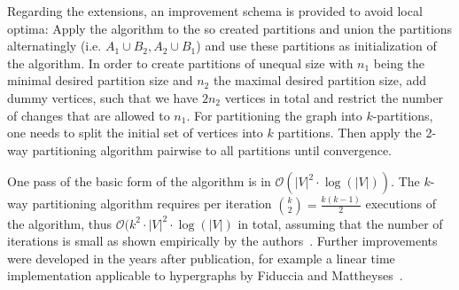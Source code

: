                 Regarding the extensions, an improvement schema is provided to avoid local optima:
                Apply the algorithm to the so created partitions and union the partitions alternatingly (i.e. $A_1 \cup B_2, A_2 \cup B_1$) and use these partitions as initialization of the algorithm.
                In order to create partitions of unequal size with $n_1$ being the minimal desired partition size and $n_2$ the maximal desired partition size, add dummy vertices, such that we have $2n_2$ vertices in total and restrict the number of changes that are allowed to $n_1$.
                For partitioning the graph into $k$-partitions, one needs to split the initial set of vertices into $k$ partitions. 
                Then apply the 2-way partitioning algorithm pairwise to all partitions until convergence.
                
                One pass of the basic form of the algorithm is in $\mathcal{O}(|V|^2 \cdot \log(|V|))$. The $k$-way partitioning algorithm requires per iteration $\binom{k}{2} = \frac{k (k - 1)}{2}$ executions of the algorithm, thus $\mathcal{O}(k^2 \cdot |V|^2 \cdot \log(|V|)$ in total, assuming that the number of iterations is small as shown empirically by the authors~\autocite{kl}. Further improvements were developed in the years after publication, for example a linear time implementation applicable to hypergraphs by Fiduccia and Mattheyses~\autocite{fm}.

